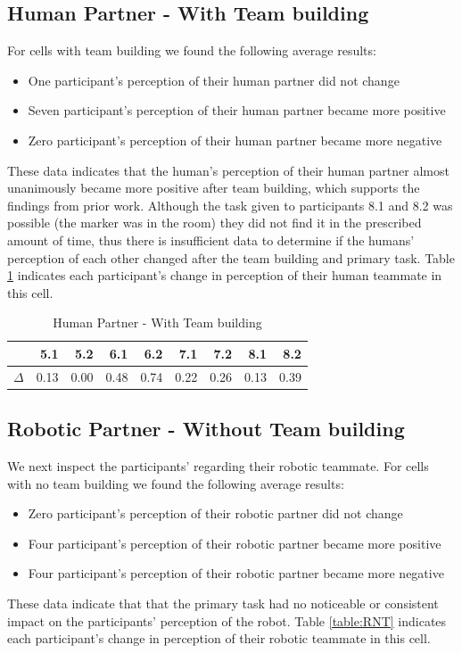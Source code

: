 \documentclass{acm_proc_article-sp}
\begin{document}
\subsection{Human Partner - With Team building}
For cells with team building we found the following average results:
\begin{itemize}
 \item One participant's perception of their human partner did not change
 \item Seven participant's perception of their human partner became more positive
 \item Zero participant's perception of their human partner became more negative
\end{itemize}
These data indicates that the human's perception of their human partner almost unanimously became more positive after team building, which supports the findings from prior work. Although the task given to participants 8.1 and 8.2 was possible (the marker was in the room) they did not find it in the prescribed amount of time, thus there is insufficient data to determine if the humans' perception of each other changed after the team building and primary task. Table \ref{table:HT} indicates each participant's change in perception of their human teammate in this cell.

\begin{table}
\centering
\caption{Human Partner - With Team building}
\begin{tabular}{|r|r|r|r|r|r|r|r|r|} \hline
&5.1&5.2&6.1&6.2&7.1&7.2&8.1&8.2 \\ \hline
$\Delta$&0.13&0.00&0.48&0.74&0.22&0.26&0.13&0.39 \\ \hline
\end{tabular}
\label{table:HT}
\end{table}

\subsection{Robotic Partner - Without Team building}
We next inspect the participants' regarding their  robotic teammate. For cells with no team building we found the following average results:
\begin{itemize}
 \item Zero participant's perception of their robotic partner did not change
 \item Four participant's perception of their robotic partner became more positive
 \item Four participant's perception of their robotic partner became more negative
\end{itemize}
These data indicate that that the primary task had no noticeable or consistent impact on the participants' perception of the robot. Table \ref{table:RNT} indicates each participant's change in perception of their robotic teammate in this cell.
\end{document}
